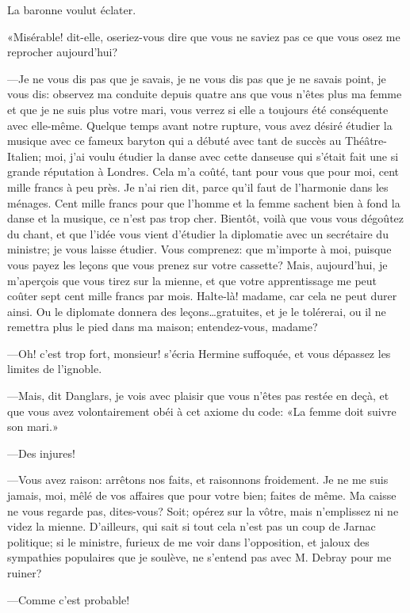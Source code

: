 La baronne voulut éclater. 

«Misérable! dit-elle, oseriez-vous dire que vous ne saviez pas ce que vous osez me reprocher aujourd'hui? 

—Je ne vous dis pas que je savais, je ne vous dis pas que je ne savais point, je vous dis: observez ma conduite depuis quatre ans que vous n'êtes plus ma femme et que je ne suis plus votre mari, vous verrez si elle a toujours été conséquente avec elle-même. Quelque temps avant notre rupture, vous avez désiré étudier la musique avec ce fameux baryton qui a débuté avec tant de succès au Théâtre-Italien; moi, j'ai voulu étudier la danse avec cette danseuse qui s'était fait une si grande réputation à Londres. Cela m'a coûté, tant pour vous que pour moi, cent mille francs à peu près. Je n'ai rien dit, parce qu'il faut de l'harmonie dans les ménages. Cent mille francs pour que l'homme et la femme sachent bien à fond la danse et la musique, ce n'est pas trop cher. Bientôt, voilà que vous vous dégoûtez du chant, et que l'idée vous vient d'étudier la diplomatie avec un secrétaire du ministre; je vous laisse étudier. Vous comprenez: que m'importe à moi, puisque vous payez les leçons que vous prenez sur votre cassette? Mais, aujourd'hui, je m'aperçois que vous tirez sur la mienne, et que votre apprentissage me peut coûter sept cent mille francs par mois. Halte-là! madame, car cela ne peut durer ainsi. Ou le diplomate donnera des leçons\dots gratuites, et je le tolérerai, ou il ne remettra plus le pied dans ma maison; entendez-vous, madame? 

—Oh! c'est trop fort, monsieur! s'écria Hermine suffoquée, et vous dépassez les limites de l'ignoble. 

—Mais, dit Danglars, je vois avec plaisir que vous n'êtes pas restée en deçà, et que vous avez volontairement obéi à cet axiome du code: «La femme doit suivre son mari.» 

—Des injures! 

—Vous avez raison: arrêtons nos faits, et raisonnons froidement. Je ne me suis jamais, moi, mêlé de vos affaires que pour votre bien; faites de même. Ma caisse ne vous regarde pas, dites-vous? Soit; opérez sur la vôtre, mais n'emplissez ni ne videz la mienne. D'ailleurs, qui sait si tout cela n'est pas un coup de Jarnac politique; si le ministre, furieux de me voir dans l'opposition, et jaloux des sympathies populaires que je soulève, ne s'entend pas avec M. Debray pour me ruiner? 

—Comme c'est probable! 

